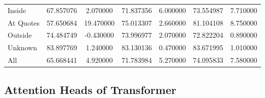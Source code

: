\begin{table}[!ht]
\begin{tabular}{lSSSSSS@{}}
        \tabindent Inside           & 67.857076                                      & 2.070000                                    & 71.837356                                     & 6.000000  & 73.554987    & 7.710000  \\
        \tabindent At Quotes        & 57.650684                                      & 19.470000                                   & 75.013307                                     & 2.660000  & 81.104108    & 8.750000  \\
        \tabindent Outside          & 74.484749                                      & -0.430000                                   & 73.996977                                     & 2.070000  & 72.822204    & 0.890000  \\
        \tabindent Unknown          & 83.897769                                      & 1.240000                                    & 83.130136                                     & 0.470000  & 83.671995    & 1.010000  \\
        \cmidrule(rl){1-7}
        All                         & 65.668441                                      & 4.920000                                    & 71.783984                                     & 5.270000  & 74.095833    & 7.580000  \\
        \bottomrule
    \end{tabular}
\end{table}

\clearpage

\subsection{Attention Heads of Transformer}
\label{app:attention-heads-of-transformer}

